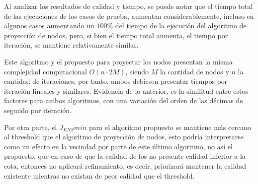 Al analizar los resultados de calidad y tiempo, se puede notar que el tiempo total de las ejecuciones de los casos de prueba, aumentan considerablemente, incluso en algunos casos aumentando un $100\%$ del tiempo de la ejecución del algoritmo de proyección de nodos, pero, si bien el tiempo total aumenta, el tiempo por iteración, se mantiene relativamente similar.

Este algoritmo y el propuesto para proyectar los nodos presentan la misma complejidad computacional $O(n\cdot2M)$, siendo $M$ la cantidad de nodos y $n$ la cantidad de iteraciones, por tanto, ambos debiesen presentar tiempos por iteración lineales y similares. Evidencia de lo anterior, es la similitud entre estos factores para ambos algoritmos, con una variación del orden de las décimas de segundo por iteración.

Por otra parte, el $J_{ENS}min$ para el algoritmo propuesto se mantiene más cercano al threshold que el algoritmo de proyección de nodos, esto podría interpretarse como un efecto en la vecindad por parte de este último algoritmo, no así el propuesto, que en caso de que la calidad de los \elements{} no presente calidad inferior a la cota, entonces no aplicará refinamiento, es decir, priorizará mantener la calidad existente mientras no existan \elements{} de peor calidad que el threshold.



